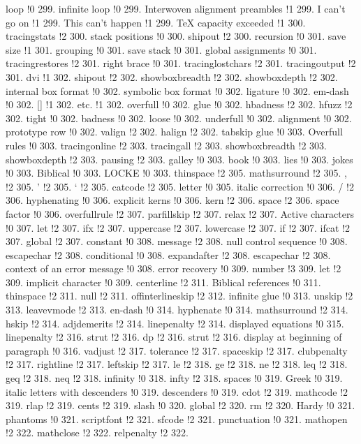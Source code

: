 loop !0 299.
infinite loop !0 299.
Interwoven alignment preambles !1 299.
I can't go on !1 299.
This can't happen !1 299.
TeX capacity exceeded !1 300.
tracingstats !2 300.
stack positions !0 300.
shipout !2 300.
recursion !0 301.
save size !1 301.
grouping !0 301.
save stack !0 301.
global assignments !0 301.
tracingrestores !2 301.
right brace !0 301.
tracinglostchars !2 301.
tracingoutput !2 301.
dvi !1 302.
shipout !2 302.
showboxbreadth !2 302.
showboxdepth !2 302.
internal box format !0 302.
symbolic box format !0 302.
ligature !0 302.
em-dash !0 302.
[] !1 302.
etc. !1 302.
overfull !0 302.
glue !0 302.
hbadness !2 302.
hfuzz !2 302.
tight !0 302.
badness !0 302.
loose !0 302.
underfull !0 302.
alignment !0 302.
prototype row !0 302.
valign !2 302.
halign !2 302.
tabskip glue !0 303.
Overfull rules !0 303.
tracingonline !2 303.
tracingall !2 303.
showboxbreadth !2 303.
showboxdepth !2 303.
pausing !2 303.
galley !0 303.
book !0 303.
lies !0 303.
jokes !0 303.
Biblical !0 303.
LOCKE !0 303.
thinspace !2 305.
mathsurround !2 305.
, !2 305.
' !2 305.
` !2 305.
catcode !2 305.
letter !0 305.
italic correction !0 306.
/ !2 306.
hyphenating !0 306.
explicit kerns !0 306.
kern !2 306.
space !2 306.
space factor !0 306.
overfullrule !2 307.
parfillskip !2 307.
relax !2 307.
Active characters !0 307.
let !2 307.
ifx !2 307.
uppercase !2 307.
lowercase !2 307.
if !2 307.
ifcat !2 307.
global !2 307.
constant !0 308.
message !2 308.
null control sequence !0 308.
escapechar !2 308.
conditional !0 308.
expandafter !2 308.
escapechar !2 308.
context of an error message !0 308.
error recovery !0 309.
number !3 309.
let !2 309.
implicit character !0 309.
centerline !2 311.
Biblical references !0 311.
thinspace !2 311.
null !2 311.
offinterlineskip !2 312.
infinite glue !0 313.
unskip !2 313.
leavevmode !2 313.
en-dash !0 314.
hyphenate !0 314.
mathsurround !2 314.
hskip !2 314.
adjdemerits !2 314.
linepenalty !2 314.
displayed equations !0 315.
linepenalty !2 316.
strut !2 316.
dp !2 316.
strut !2 316.
display at beginning of paragraph !0 316.
vadjust !2 317.
tolerance !2 317.
spaceskip !2 317.
clubpenalty !2 317.
rightline !2 317.
leftskip !2 317.
le !2 318.
ge !2 318.
ne !2 318.
leq !2 318.
geq !2 318.
neq !2 318.
infinity !0 318.
infty !2 318.
spaces !0 319.
Greek !0 319.
italic letters with descenders !0 319.
descenders !0 319.
cdot !2 319.
mathcode !2 319.
rlap !2 319.
cents !2 319.
slash !0 320.
global !2 320.
rm !2 320.
Hardy !0 321.
phantoms !0 321.
scriptfont !2 321.
sfcode !2 321.
punctuation !0 321.
mathopen !2 322.
mathclose !2 322.
relpenalty !2 322.
